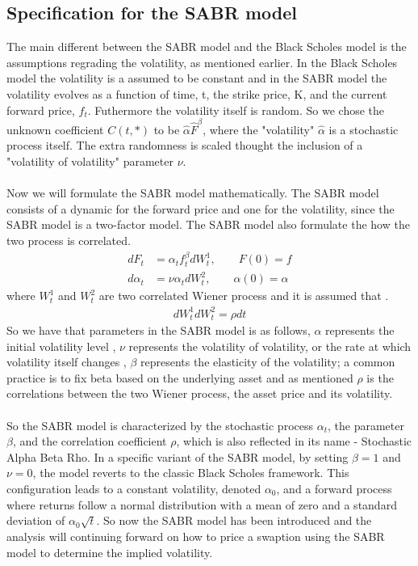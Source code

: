 \subsection{Specification for the SABR model}
The main different between the SABR model and the 
Black Scholes model is the assumptions regrading the 
volatility, as mentioned earlier. In the Black Scholes 
model the volatility is a assumed to be constant and 
in the SABR model the volatility evolves as a function
of time, t, the strike price, K, and the current
forward price, $f_t$. Futhermore the volatility itself
is random. So we chose the unknown coefficient $C(t,*)$
to be $\hat{\alpha} \hat{F}^{\beta}$, where the 
"volatility" $\hat{\alpha}$ is a stochastic process itself. 
The extra randomness is scaled thought the inclusion 
of a "volatility of volatility" parameter $\nu$.
\\\\
Now we will formulate the SABR model mathematically. 
The SABR model consists of a dynamic for the forward price
and one for the volatility, since the SABR model is a 
two-factor model. The SABR model also formulate the 
how the two process is correlated. 
\begin{align}
    d F_t &= \alpha_t f_t^\beta dW_t^1, \quad \quad F(0)=f   \label{f_dyn}\\
    d\alpha_t &= \nu \alpha_t dW_t^2, \quad \quad \alpha(0)=\alpha \label{sigma_dyn}
\end{align}
where $W_t^{1}$ and $W_t^{2}$ are two correlated Wiener 
process and it is assumed that \cite{Smile}.
\begin{align}
    dW_t^{1}dW_t^{2}=\rho dt
\end{align}
So we have that 
parameters in the SABR model is as follows, $\alpha$ represents the initial volatility level
, $\nu$ represents the volatility of volatility, or the rate at which volatility itself changes
, $\beta$ represents the elasticity of the volatility; a common practice is to fix beta based on the underlying asset 
and as mentioned $\rho$ is the correlations between the 
two Wiener process, the asset price and its volatility. 
\\\\
So the SABR model is characterized by the stochastic process $\alpha_t$,
the parameter $\beta$, and the correlation coefficient $\rho$,
which is also reflected in its name - Stochastic Alpha Beta Rho.
In a specific variant of the SABR model, 
by setting $\beta = 1 $ and $\nu = 0$, the model reverts 
to the classic Black Scholes framework. 
This configuration leads to a constant volatility, 
denoted $\alpha_0 $, 
and a forward process where returns follow a 
normal distribution with a mean of zero and a standard 
deviation of $\alpha_0 \sqrt{t}$. So now the SABR model
has been introduced and the analysis will continuing forward 
on how to price a swaption using the SABR model to determine the implied
volatility.
